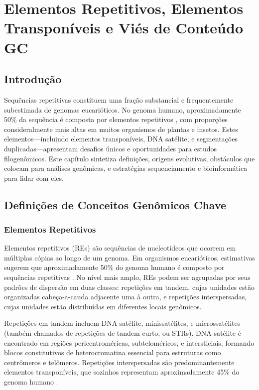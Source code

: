 
\chapter{Elementos Repetitivos, Elementos Transponíveis e Viés de Conteúdo GC}

\section{Introdução}

Sequências repetitivas constituem uma fração substancial e frequentemente subestimada de genomas eucarióticos. No genoma humano, aproximadamente 50\% da sequência é composta por elementos repetitivos \parencite{lander2001,dekonig2011}, com proporções consideralmente mais altas em muitos organismos de plantas e insetos. Estes elementos---incluindo elementos transponíveis, DNA satélite, e segmentações duplicadas---apresentam desafios únicos e oportunidades para estudos filogenômicos. Este capítulo sintetiza definições, origens evolutivas, obstáculos que colocam para análises genômicas, e estratégias sequenciamento e bioinformática para lidar com eles.

\section{Definições de Conceitos Genômicos Chave}

\subsection{Elementos Repetitivos}

Elementos repetitivos (REs) são sequências de nucleotídeos que ocorrem em múltiplas cópias ao longo de um genoma. Em organismos eucarióticos, estimativas sugerem que aproximadamente 50\% do genoma humano é composto por sequências repetitivas \parencite{haubold2006}. No nível mais amplo, REs podem ser agrupadas por seus padrões de dispersão em duas classes: repetições em tandem, cujas unidades estão organizadas cabeça-a-cauda adjacente uma à outra, e repetições interspersadas, cujas unidades estão distribuídas em diferentes locais genômicos.

Repetições em tandem incluem DNA satélite, minissatélites, e microssatélites (também chamados de repetições de tandem curto, ou STRs). DNA satélite é encontrado em regiões pericentroméricas, subteloméricos, e intersticiais, formando blocos constitutivos de heterocromatina essencial para estruturas como centrômeros e telômeros. Repetições interspersadas são predominantemente elementos transponíveis, que sozinhos representam aproximadamente 45\% do genoma humano \parencite{ruizruano2023}.

